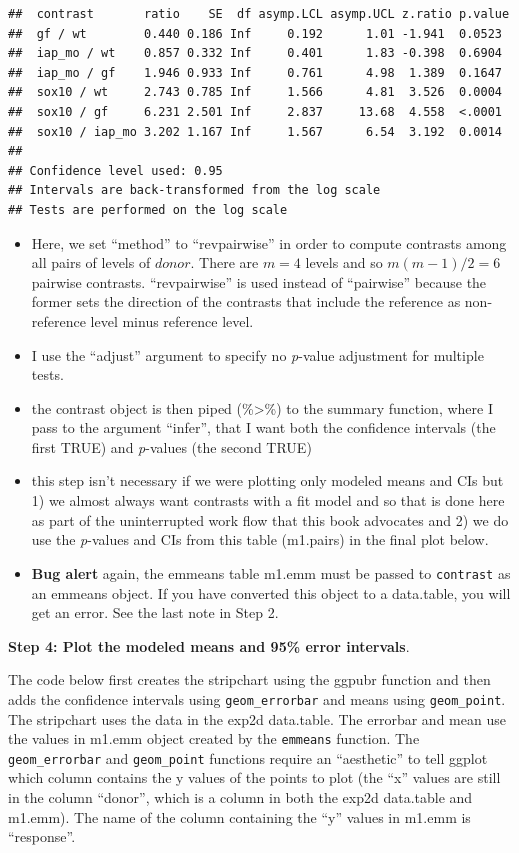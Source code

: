 \documentclass[]{book}
\providecommand{\tightlist}{%
  \setlength{\itemsep}{0pt}\setlength{\parskip}{0pt}}
\begin{document}
\begin{verbatim}
##  contrast       ratio    SE  df asymp.LCL asymp.UCL z.ratio p.value
##  gf / wt        0.440 0.186 Inf     0.192      1.01 -1.941  0.0523 
##  iap_mo / wt    0.857 0.332 Inf     0.401      1.83 -0.398  0.6904 
##  iap_mo / gf    1.946 0.933 Inf     0.761      4.98  1.389  0.1647 
##  sox10 / wt     2.743 0.785 Inf     1.566      4.81  3.526  0.0004 
##  sox10 / gf     6.231 2.501 Inf     2.837     13.68  4.558  <.0001 
##  sox10 / iap_mo 3.202 1.167 Inf     1.567      6.54  3.192  0.0014 
## 
## Confidence level used: 0.95 
## Intervals are back-transformed from the log scale 
## Tests are performed on the log scale
\end{verbatim}

\begin{itemize}
\tightlist
\item
  Here, we set ``method'' to ``revpairwise'' in order to compute contrasts among all pairs of levels of \(donor\). There are \(m = 4\) levels and so \(m(m-1)/2 = 6\) pairwise contrasts. ``revpairwise'' is used instead of ``pairwise'' because the former sets the direction of the contrasts that include the reference as non-reference level minus reference level.
\item
  I use the ``adjust'' argument to specify no \emph{p}-value adjustment for multiple tests.
\item
  the contrast object is then piped (\%\textgreater\%) to the summary function, where I pass to the argument ``infer'', that I want both the confidence intervals (the first TRUE) and \emph{p}-values (the second TRUE)
\item
  this step isn't necessary if we were plotting only modeled means and CIs but 1) we almost always want contrasts with a fit model and so that is done here as part of the uninterrupted work flow that this book advocates and 2) we do use the \emph{p}-values and CIs from this table (m1.pairs) in the final plot below.
\item
  \textbf{Bug alert} again, the emmeans table m1.emm must be passed to \texttt{contrast} as an emmeans object. If you have converted this object to a data.table, you will get an error. See the last note in Step 2.
\end{itemize}

\textbf{Step 4: Plot the modeled means and 95\% error intervals}.

The code below first creates the stripchart using the ggpubr function and then adds the confidence intervals using \texttt{geom\_errorbar} and means using \texttt{geom\_point}. The stripchart uses the data in the exp2d data.table. The errorbar and mean use the values in m1.emm object created by the \texttt{emmeans} function. The \texttt{geom\_errorbar} and \texttt{geom\_point} functions require an ``aesthetic'' to tell ggplot which column contains the y values of the points to plot (the ``x'' values are still in the column ``donor'', which is a column in both the exp2d data.table and m1.emm). The name of the column containing the ``y'' values in m1.emm is ``response''.
\end{document}
